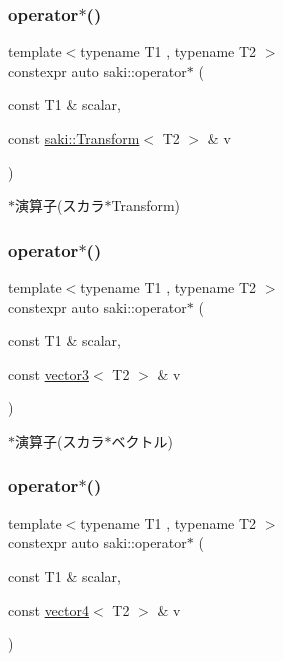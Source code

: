 \subsubsection{\texorpdfstring{operator$\ast$()}{operator*()}\hspace{0.1cm}{\footnotesize\ttfamily [5/14]}}
{\footnotesize\ttfamily template$<$typename T1 , typename T2 $>$ \\
constexpr auto saki\+::operator$\ast$ (\begin{DoxyParamCaption}\item[{const T1 \&}]{scalar,  }\item[{const \mbox{\hyperlink{classsaki_1_1_transform}{saki\+::\+Transform}}$<$ T2 $>$ \&}]{v }\end{DoxyParamCaption})}



$\ast$演算子(スカラ$\ast$\+Transform) 

\mbox{\label{namespacesaki_ab3e41594237dcaac47a2a27ed97f48f6}} 
\subsubsection{\texorpdfstring{operator$\ast$()}{operator*()}\hspace{0.1cm}{\footnotesize\ttfamily [6/14]}}
{\footnotesize\ttfamily template$<$typename T1 , typename T2 $>$ \\
constexpr auto saki\+::operator$\ast$ (\begin{DoxyParamCaption}\item[{const T1 \&}]{scalar,  }\item[{const \mbox{\hyperlink{classsaki_1_1vector3}{vector3}}$<$ T2 $>$ \&}]{v }\end{DoxyParamCaption})}



$\ast$演算子(スカラ$\ast$ベクトル) 

\mbox{\label{namespacesaki_ad1caaaf5b1af879f2d546a4b2e10974e}} 
\subsubsection{\texorpdfstring{operator$\ast$()}{operator*()}\hspace{0.1cm}{\footnotesize\ttfamily [7/14]}}
{\footnotesize\ttfamily template$<$typename T1 , typename T2 $>$ \\
constexpr auto saki\+::operator$\ast$ (\begin{DoxyParamCaption}\item[{const T1 \&}]{scalar,  }\item[{const \mbox{\hyperlink{classsaki_1_1vector4}{vector4}}$<$ T2 $>$ \&}]{v }\end{DoxyParamCaption})}




